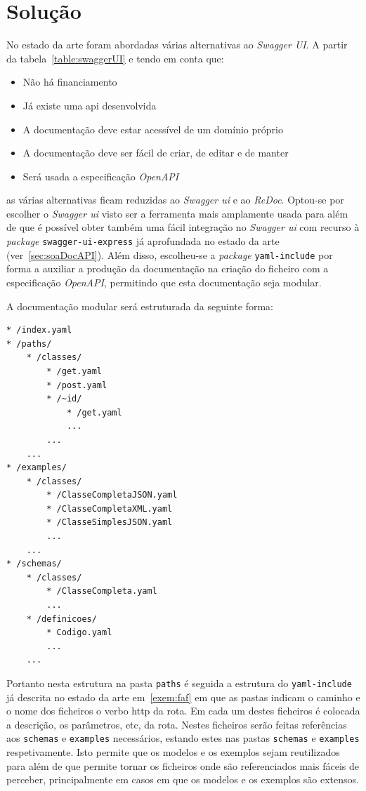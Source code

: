 \section{Solução}

No estado da arte foram abordadas várias alternativas ao \textit{Swagger UI}. A partir da tabela~\ref{table:swaggerUI} e tendo em conta que:
\begin{itemize}
    \item Não há financiamento
    \item Já existe uma \acrshort{api} desenvolvida
    \item A documentação deve estar acessível de um domínio próprio
    \item A documentação deve ser fácil de criar, de editar e de manter
    \item Será usada a especificação \textit{OpenAPI}
\end{itemize}

as várias alternativas ficam reduzidas ao \textit{Swagger \acrshort{ui}} e ao \textit{ReDoc}. Optou-se por escolher o \textit{Swagger \acrshort{ui}} visto ser a ferramenta mais amplamente usada para além de que é possível obter também uma fácil integração no \textit{Swagger \acrshort{ui}} com recurso à \textit{package} \texttt{swagger-ui-express} já aprofundada no estado da arte (ver~\ref{sec:soaDocAPI}). Além disso, escolheu-se a \textit{package} \texttt{yaml-include} por forma a auxiliar a produção da documentação na criação do ficheiro com a especificação \textit{OpenAPI}, permitindo que esta documentação seja modular.

A documentação modular será estruturada da seguinte forma:

\begin{lstlisting}[caption=Excerto da estrutura modular da documentação]
* /index.yaml
* /paths/
    * /classes/
        * /get.yaml
        * /post.yaml
        * /~id/
            * /get.yaml
            ...
        ...
    ...
* /examples/
    * /classes/
        * /ClasseCompletaJSON.yaml
        * /ClasseCompletaXML.yaml
        * /ClasseSimplesJSON.yaml
        ...
    ...
* /schemas/
    * /classes/
        * /ClasseCompleta.yaml
        ...
    * /definicoes/
        * Codigo.yaml
        ...
    ...
\end{lstlisting}

Portanto nesta estrutura na pasta \texttt{paths} é seguida a estrutura do \texttt{yaml-include} já descrita no estado da arte em~\ref{exem:faf} em que as pastas indicam o caminho e o nome dos ficheiros o verbo \acrshort{http} da rota. Em cada um destes ficheiros é colocada a descrição, os parâmetros, etc, da rota. Nestes ficheiros serão feitas referências aos \texttt{schemas} e \texttt{examples} necessários, estando estes nas pastas \texttt{schemas} e \texttt{examples} respetivamente. Isto permite que os modelos e os exemplos sejam reutilizados para além de que permite tornar os ficheiros onde são referenciados mais fáceis de perceber, principalmente em casos em que os modelos e os exemplos são extensos.

